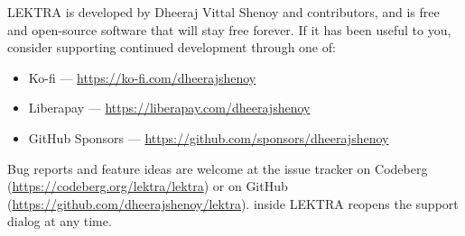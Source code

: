 \documentclass[a4paper,12pt]{article}
\begin{document}
LEKTRA is developed by Dheeraj Vittal Shenoy and contributors, and is free and open-source software that will stay free forever. If it has been useful to you, consider supporting continued development through one of:

\begin{itemize}[leftmargin=*]
    \item Ko-fi — \url{https://ko-fi.com/dheerajshenoy}
    \item Liberapay — \url{https://liberapay.com/dheerajshenoy}
    \item GitHub Sponsors — \url{https://github.com/sponsors/dheerajshenoy}
\end{itemize}

Bug reports and feature ideas are welcome at the issue tracker on Codeberg (\url{https://codeberg.org/lektra/lektra}) or on GitHub (\url{https://github.com/dheerajshenoy/lektra}).  inside LEKTRA reopens the support dialog at any time.
\end{document}
